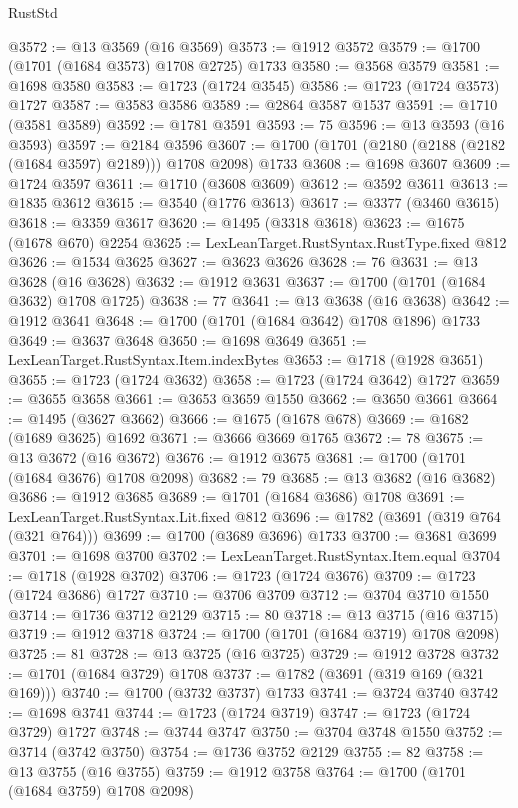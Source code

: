 \begin{lexlean}{RustStd}
\begin{coremodule}
@3572 := @13 @3569 (@16 @3569)
@3573 := @1912 @3572
@3579 := @1700 (@1701 (@1684 @3573) @1708 @2725) @1733
@3580 := @3568 @3579
@3581 := @1698 @3580
@3583 := @1723 (@1724 @3545)
@3586 := @1723 (@1724 @3573) @1727
@3587 := @3583 @3586
@3589 := @2864 @3587 @1537
@3591 := @1710 (@3581 @3589)
@3592 := @1781 @3591
@3593 := 75
@3596 := @13 @3593 (@16 @3593)
@3597 := @2184 @3596
@3607 := @1700 (@1701 (@2180 (@2188 (@2182 (@1684 @3597) @2189))) @1708 @2098) @1733
@3608 := @1698 @3607
@3609 := @1724 @3597
@3611 := @1710 (@3608 @3609)
@3612 := @3592 @3611
@3613 := @1835 @3612
@3615 := @3540 (@1776 @3613)
@3617 := @3377 (@3460 @3615)
@3618 := @3359 @3617
@3620 := @1495 (@3318 @3618)
@3623 := @1675 (@1678 @670) @2254
@3625 := LexLeanTarget.RustSyntax.RustType.fixed @812
@3626 := @1534 @3625
@3627 := @3623 @3626
@3628 := 76
@3631 := @13 @3628 (@16 @3628)
@3632 := @1912 @3631
@3637 := @1700 (@1701 (@1684 @3632) @1708 @1725)
@3638 := 77
@3641 := @13 @3638 (@16 @3638)
@3642 := @1912 @3641
@3648 := @1700 (@1701 (@1684 @3642) @1708 @1896) @1733
@3649 := @3637 @3648
@3650 := @1698 @3649
@3651 := LexLeanTarget.RustSyntax.Item.indexBytes
@3653 := @1718 (@1928 @3651)
@3655 := @1723 (@1724 @3632)
@3658 := @1723 (@1724 @3642) @1727
@3659 := @3655 @3658
@3661 := @3653 @3659 @1550
@3662 := @3650 @3661
@3664 := @1495 (@3627 @3662)
@3666 := @1675 (@1678 @678)
@3669 := @1682 (@1689 @3625) @1692
@3671 := @3666 @3669 @1765
@3672 := 78
@3675 := @13 @3672 (@16 @3672)
@3676 := @1912 @3675
@3681 := @1700 (@1701 (@1684 @3676) @1708 @2098)
@3682 := 79
@3685 := @13 @3682 (@16 @3682)
@3686 := @1912 @3685
@3689 := @1701 (@1684 @3686) @1708
@3691 := LexLeanTarget.RustSyntax.Lit.fixed @812
@3696 := @1782 (@3691 (@319 @764 (@321 @764)))
@3699 := @1700 (@3689 @3696) @1733
@3700 := @3681 @3699
@3701 := @1698 @3700
@3702 := LexLeanTarget.RustSyntax.Item.equal
@3704 := @1718 (@1928 @3702)
@3706 := @1723 (@1724 @3676)
@3709 := @1723 (@1724 @3686) @1727
@3710 := @3706 @3709
@3712 := @3704 @3710 @1550
@3714 := @1736 @3712 @2129
@3715 := 80
@3718 := @13 @3715 (@16 @3715)
@3719 := @1912 @3718
@3724 := @1700 (@1701 (@1684 @3719) @1708 @2098)
@3725 := 81
@3728 := @13 @3725 (@16 @3725)
@3729 := @1912 @3728
@3732 := @1701 (@1684 @3729) @1708
@3737 := @1782 (@3691 (@319 @169 (@321 @169)))
@3740 := @1700 (@3732 @3737) @1733
@3741 := @3724 @3740
@3742 := @1698 @3741
@3744 := @1723 (@1724 @3719)
@3747 := @1723 (@1724 @3729) @1727
@3748 := @3744 @3747
@3750 := @3704 @3748 @1550
@3752 := @3714 (@3742 @3750)
@3754 := @1736 @3752 @2129
@3755 := 82
@3758 := @13 @3755 (@16 @3755)
@3759 := @1912 @3758
@3764 := @1700 (@1701 (@1684 @3759) @1708 @2098)

\end{coremodule}
\end{lexlean}
